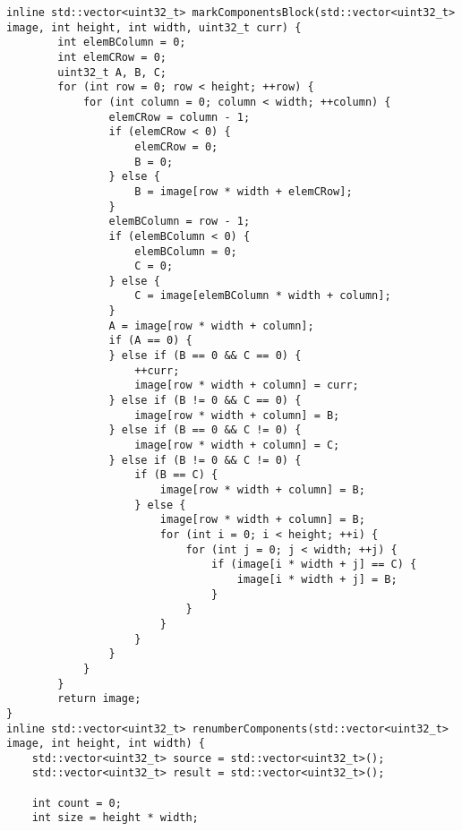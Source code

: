 \documentclass{report}
\begin{document}
\begin{lstlisting}
inline std::vector<uint32_t> markComponentsBlock(std::vector<uint32_t> image, int height, int width, uint32_t curr) {
        int elemBColumn = 0;
        int elemCRow = 0;
        uint32_t A, B, C;
        for (int row = 0; row < height; ++row) {
            for (int column = 0; column < width; ++column) {
                elemCRow = column - 1;
                if (elemCRow < 0) {
                    elemCRow = 0;
                    B = 0;
                } else {
                    B = image[row * width + elemCRow];
                }
                elemBColumn = row - 1;
                if (elemBColumn < 0) {
                    elemBColumn = 0;
                    C = 0;
                } else {
                    C = image[elemBColumn * width + column];
                }
                A = image[row * width + column];
                if (A == 0) {
                } else if (B == 0 && C == 0) {
                    ++curr;
                    image[row * width + column] = curr;
                } else if (B != 0 && C == 0) {
                    image[row * width + column] = B;
                } else if (B == 0 && C != 0) {
                    image[row * width + column] = C;
                } else if (B != 0 && C != 0) {
                    if (B == C) {
                        image[row * width + column] = B;
                    } else {
                        image[row * width + column] = B;
                        for (int i = 0; i < height; ++i) {
                            for (int j = 0; j < width; ++j) {
                                if (image[i * width + j] == C) {
                                    image[i * width + j] = B;
                                }
                            }
                        }
                    }
                }
            }
        }
        return image;
}
inline std::vector<uint32_t> renumberComponents(std::vector<uint32_t> image, int height, int width) {
    std::vector<uint32_t> source = std::vector<uint32_t>();
    std::vector<uint32_t> result = std::vector<uint32_t>();

    int count = 0;
    int size = height * width;


\end{lstlisting}
\end{document}
